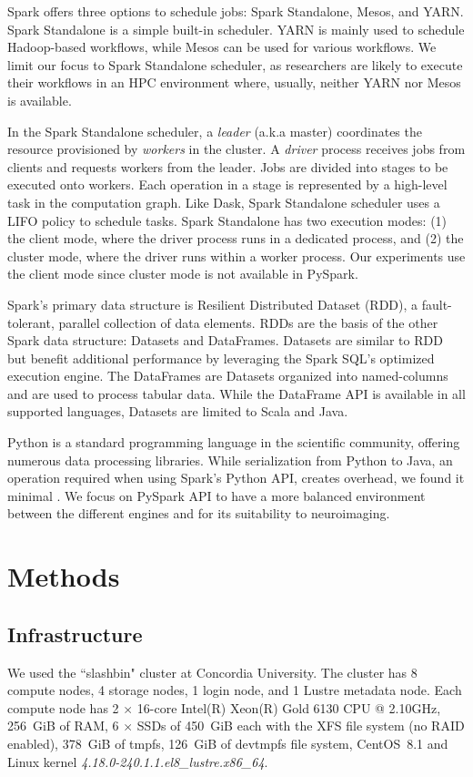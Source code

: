 \documentclass[conference]{IEEEtran}
\begin{document}
Spark offers three options to schedule jobs: Spark Standalone, Mesos, and YARN.
Spark Standalone is a simple built-in scheduler.
YARN is mainly used to schedule Hadoop-based workflows, while Mesos can be used for various workflows.
We limit our focus to Spark Standalone scheduler, as researchers are likely to execute their workflows in an HPC environment where, usually, neither YARN nor Mesos is available.

In the Spark Standalone scheduler, a \textit{leader} (a.k.a master) coordinates the resource provisioned by \textit{workers} in the cluster.
A \textit{driver}  process receives jobs from clients and requests workers from the leader.
Jobs are divided into stages to be executed onto workers.
Each operation in a stage is represented by a high-level task in the computation graph.
Like Dask, Spark Standalone scheduler uses a LIFO policy to schedule tasks.
Spark Standalone has two execution modes: (1) the client mode, where the driver process runs in a dedicated process,
and (2) the cluster mode, where the driver runs within a worker process.
Our experiments use the client mode since cluster mode is not available in PySpark.

Spark's primary data structure is Resilient Distributed Dataset (RDD)\cite{RDD}, a fault-tolerant, parallel collection of data elements.
RDDs are the basis of the other Spark data structure: Datasets and DataFrames.
Datasets are similar to RDD but benefit additional performance by leveraging the Spark SQL's optimized execution engine. 
The DataFrames are Datasets organized into named-columns and are used to process tabular data. 
While the DataFrame API is available in all supported languages, Datasets are limited to Scala and Java. 

Python is a standard programming language in the scientific community, offering numerous data processing libraries.
While serialization from Python to Java, an operation required when using Spark's Python API, creates overhead, we found it minimal \cite{8943502}.
We focus on PySpark API to have a more balanced environment between the different engines and for its suitability to neuroimaging.

\section{Methods}
\subsection{Infrastructure}
We used the ``slashbin" cluster at Concordia University.
The cluster has 8 compute nodes, 4 storage nodes, 1 login node, and 1
Lustre metadata node. Each
compute node has 2 $\times$ 16-core Intel(R) Xeon(R) Gold 6130 CPU
@ 2.10GHz, 256~GiB of RAM, 6 $\times$ SSDs of 450~GiB each with the XFS
file system (no RAID enabled), 378~GiB of tmpfs, 126~GiB of devtmpfs file system,
CentOS~8.1 and Linux kernel
\textit{4.18.0-240.1.1.el8\_lustre.x86\_64}.
\end{document}
